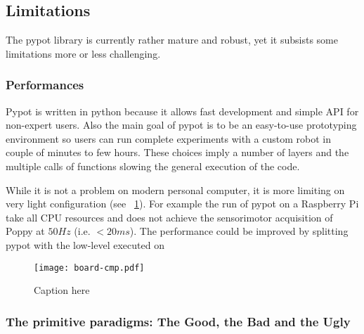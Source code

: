 \subsection{Limitations} %

The pypot library is currently rather mature and robust, yet it subsists some limitations more or less challenging.

\subsubsection{Performances}

Pypot is written in python because it allows fast development and simple API for non-expert users. Also the main goal of pypot is to be an easy-to-use prototyping environment so users can run complete experiments with a custom robot in couple of minutes to few hours. These choices imply a number of layers and the multiple calls of functions slowing the general execution of the code.

While it is not a problem on modern personal computer, it is more limiting on very light configuration (see \figurename~\ref{fig:pypot-board-comparaison}). For example the run of pypot on a Raspberry Pi take all CPU resources and does not achieve the sensorimotor acquisition of Poppy at $50Hz$ (i.e. $<20ms$).
The performance could be improved by splitting pypot with the low-level executed on

\begin{figure}[tb]
    \begin{center}
        \texttt{[image: board-cmp.pdf]}
    \end{center}
    \caption{Caption here}
    \label{fig:pypot-board-comparaison}
\end{figure}

\begin{figure}[tb]
\centering
    \hfil
    \caption{}
    \label{fig:pypot-run}
\end{figure}



\subsubsection{The primitive paradigms: The Good, the Bad and the Ugly}

